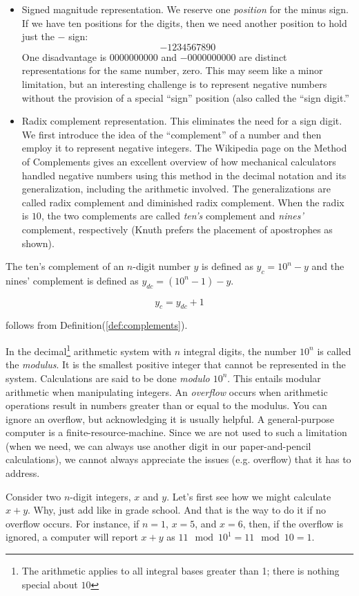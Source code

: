 \begin{itemize}
\item Signed magnitude representation. We reserve one \textit{position} for the minus sign. If we have ten positions for the digits, then we need another position to hold just the $-$ sign:
$$
-1234567890
$$
One disadvantage is $0000000000$ and $-0000000000$ are distinct representations for the same number, zero. This may seem like a minor limitation, but an interesting challenge is to represent negative numbers without the provision of a special ``sign'' position (also called the ``sign digit.''

\item Radix complement representation. This eliminates the need for a sign digit. We first introduce the idea of the ``complement'' of a number and then employ it to represent negative integers. The Wikipedia page on the Method of Complements \cite{Complements} gives an excellent overview of how mechanical calculators handled negative numbers using this method in the decimal notation and its generalization, including the arithmetic involved. The generalizations are called radix complement and diminished radix complement. When the radix is $10$, the two complements are called \textit{ten's} complement and \textit{nines'} complement, respectively (Knuth prefers the placement of apostrophes as shown).
\end{itemize}

\begin{definition}\label{def:complements}
The ten's complement of an $n$-digit number $y$ is defined as $y_c=10^n-y$ and the nines' complement is defined as $y_{dc}=(10^n-1)-y$.
\end{definition}

\begin{equation} \label{eqn:complements}
y_c=y_{dc}+1
\end{equation}

follows from Definition(\ref{def:complements}).

In the decimal\footnote{The arithmetic applies to all integral bases greater than 1; there is nothing special about $10$} arithmetic system with $n$ integral digits, the number $10^n$ is called the \emph{modulus}. It is the smallest positive integer that cannot be represented in the system. Calculations are said to be done \emph{modulo $10^n$}. This entails modular arithmetic when manipulating integers. An \textit{overflow} occurs when arithmetic operations result in numbers greater than or equal to the modulus. You can ignore an overflow, but acknowledging it is usually helpful. A general-purpose computer is a finite-resource-machine. Since we are not used to such a limitation (when we need, we can always use another digit in our paper-and-pencil calculations), we cannot always appreciate the issues (e.g. overflow) that it has to address. 

Consider two $n$-digit integers, $x$ and $y$. Let's first see how we might calculate $x+y$. Why, just add like in grade school. And that is the way to do it if no overflow occurs. For instance, if $n=1$, $x=5$, and $x=6$, then, if the overflow is ignored, a computer will report $x+y$ as $11\mod 10^1=11\mod 10=1$.


